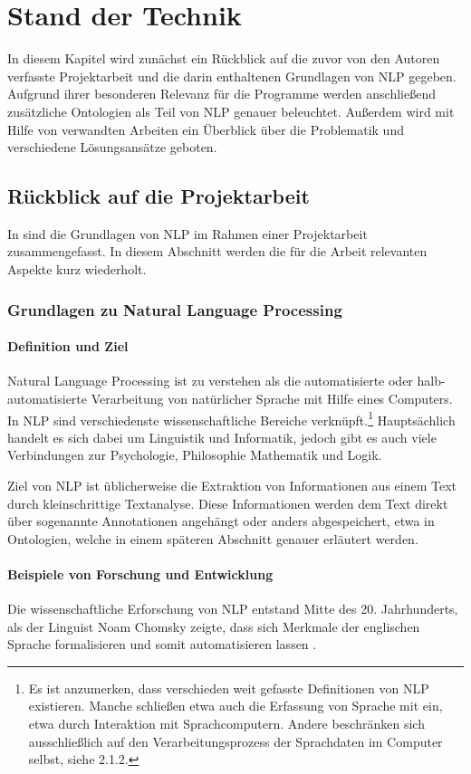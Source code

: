 \documentclass[12pt]{report}
\begin{document}
\chapter{Stand der Technik}
In diesem Kapitel wird zunächst ein Rückblick auf die zuvor von den Autoren verfasste Projektarbeit und die darin enthaltenen Grundlagen von NLP gegeben. 
Aufgrund ihrer besonderen Relevanz für die Programme werden anschließend zusätzliche Ontologien als Teil von NLP genauer beleuchtet. 
Außerdem wird mit Hilfe von verwandten Arbeiten ein Überblick über die Problematik und verschiedene Lösungsansätze geboten. 

\section[Rückblick auf die PA]{Rückblick auf die Projektarbeit}
In \cite{rs18} sind die Grundlagen von NLP im Rahmen einer Projektarbeit zusammengefasst. In diesem Abschnitt werden die für die Arbeit relevanten Aspekte kurz wiederholt. 
\subsection{Grundlagen zu Natural Language Processing}
\subsubsection{Definition und Ziel}
Natural Language Processing ist zu verstehen als die automatisierte oder halb-automatisierte Verarbeitung von natürlicher Sprache mit Hilfe eines Computers. In NLP sind verschiedenste wissenschaftliche Bereiche verknüpft.\footnote{Es ist anzumerken, dass verschieden weit gefasste Definitionen von NLP existieren. Manche schließen etwa auch die Erfassung von Sprache mit ein, etwa durch Interaktion mit Sprachcomputern. Andere beschränken sich ausschließlich auf den Verarbeitungsprozess der Sprachdaten im Computer selbst, siehe 2.1.2.} Hauptsächlich handelt es sich dabei um Linguistik und Informatik, jedoch gibt es auch viele Verbindungen zur Psychologie, Philosophie Mathematik und Logik. \cite{cop04}

Ziel von NLP ist üblicherweise die Extraktion von Informationen aus einem Text durch kleinschrittige Textanalyse. Diese Informationen werden dem Text direkt über sogenannte Annotationen angehängt oder anders abgespeichert, etwa in Ontologien, welche in einem späteren Abschnitt genauer erläutert werden.

\subsubsection{Beispiele von Forschung und Entwicklung}
Die wissenschaftliche Erforschung von NLP entstand Mitte des 20. Jahrhunderts, als der Linguist Noam Chomsky zeigte, dass sich Merkmale der englischen Sprache formalisieren und somit automatisieren lassen \cite{cho57}. 
\end{document}
